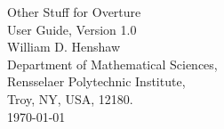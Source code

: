 \documentclass{article}
\begin{document}


\vspace{5\baselineskip}
\begin{flushleft}
{\Large
Other Stuff for Overture\\
User Guide, Version 1.0\\
}
\vspace{3\baselineskip}
William D. Henshaw  \\
Department of Mathematical Sciences, \\
Rensselaer Polytechnic Institute, \\
Troy, NY, USA, 12180. \\
\today 
% 

\vspace{4\baselineskip}


\end{flushleft}
\end{document}

